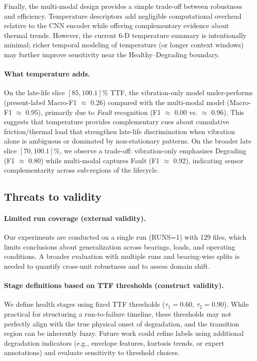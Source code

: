 \documentclass{article}
\begin{document}
Finally, the multi-modal design provides a simple trade-off between robustness and efficiency. Temperature descriptors add negligible computational overhead relative to the CNN encoder while offering complementary evidence about thermal trends. However, the current 6-D temperature summary is intentionally minimal; richer temporal modeling of temperature (or longer context windows) may further improve sensitivity near the Healthy--Degrading boundary.

\paragraph{What temperature adds.} On the late-life slice $[85,100.1]\%$ TTF, the vibration-only model under-performs (present-label Macro-F1 $\approx$ 0.26) compared with the multi-modal model (Macro-F1 $\approx$ 0.95), primarily due to \emph{Fault} recognition (F1 $\approx$ 0.00 vs. $\approx$ 0.96). This suggests that temperature provides complementary cues about cumulative friction/thermal load that strengthen late-life discrimination when vibration alone is ambiguous or dominated by non-stationary patterns. On the broader late slice $[70,100.1]\%$, we observe a trade-off: vibration-only emphasizes Degrading (F1 $\approx$ 0.80) while multi-modal captures Fault (F1 $\approx$ 0.92), indicating sensor complementarity across sub-regions of the lifecycle.

\subsection{Threats to validity}
\paragraph{Limited run coverage (external validity).}
Our experiments are conducted on a single run (RUNS=1) with 129 files, which limits conclusions about generalization across bearings, loads, and operating conditions. A broader evaluation with multiple runs and bearing-wise splits is needed to quantify cross-unit robustness and to assess domain shift.

\paragraph{Stage definitions based on TTF thresholds (construct validity).}
We define health stages using fixed TTF thresholds ($\tau_1=0.60$, $\tau_2=0.90$). While practical for structuring a run-to-failure timeline, these thresholds may not perfectly align with the true physical onset of degradation, and the transition region can be inherently fuzzy. Future work could refine labels using additional degradation indicators (e.g., envelope features, kurtosis trends, or expert annotations) and evaluate sensitivity to threshold choices.
\end{document}
